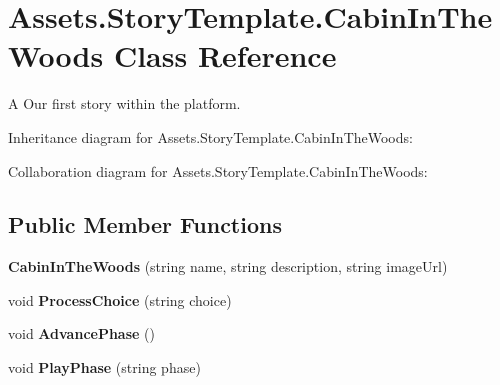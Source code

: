 \hypertarget{classAssets_1_1StoryTemplate_1_1CabinInTheWoods}{}\section{Assets.\+Story\+Template.\+Cabin\+In\+The\+Woods Class Reference}
\label{classAssets_1_1StoryTemplate_1_1CabinInTheWoods}


A Our first story within the platform.  




Inheritance diagram for Assets.\+Story\+Template.\+Cabin\+In\+The\+Woods\+:


Collaboration diagram for Assets.\+Story\+Template.\+Cabin\+In\+The\+Woods\+:
\subsection*{Public Member Functions}
\begin{DoxyCompactItemize}
\item 
{\bfseries Cabin\+In\+The\+Woods} (string name, string description, string image\+Url)\hypertarget{classAssets_1_1StoryTemplate_1_1CabinInTheWoods_aeeff8d67d43a9ec2f30b2de1e4b1ff1a}{}\label{classAssets_1_1StoryTemplate_1_1CabinInTheWoods_aeeff8d67d43a9ec2f30b2de1e4b1ff1a}

\item 
void {\bfseries Process\+Choice} (string choice)\hypertarget{classAssets_1_1StoryTemplate_1_1CabinInTheWoods_a02753cf4becc3029575668fe8c4f7747}{}\label{classAssets_1_1StoryTemplate_1_1CabinInTheWoods_a02753cf4becc3029575668fe8c4f7747}

\item 
void {\bfseries Advance\+Phase} ()\hypertarget{classAssets_1_1StoryTemplate_1_1CabinInTheWoods_ae2da1609e997b2406f3b4a8666a6fa31}{}\label{classAssets_1_1StoryTemplate_1_1CabinInTheWoods_ae2da1609e997b2406f3b4a8666a6fa31}

\item 
void {\bfseries Play\+Phase} (string phase)\hypertarget{classAssets_1_1StoryTemplate_1_1CabinInTheWoods_a51059f18613b2c49aaff7cdaee02665b}{}\label{classAssets_1_1StoryTemplate_1_1CabinInTheWoods_a51059f18613b2c49aaff7cdaee02665b}

\end{DoxyCompactItemize}
